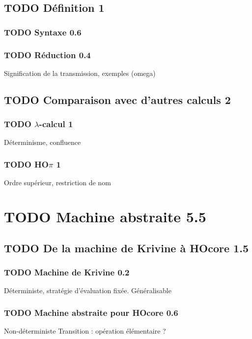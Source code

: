 \documentclass[11pt]{article}
\begin{document}
\subsection{{\bfseries\sffamily TODO} Définition 1}
\label{sec-2-1}
\subsubsection{{\bfseries\sffamily TODO} Syntaxe 0.6}
\label{sec-2-1-1}
\subsubsection{{\bfseries\sffamily TODO} Réduction 0.4}
\label{sec-2-1-2}
Signification de la transmission, exemples (omega)
\subsection{{\bfseries\sffamily TODO} Comparaison avec d'autres calculs 2}
\label{sec-2-2}
\subsubsection{{\bfseries\sffamily TODO} $\lambda$-calcul 1}
\label{sec-2-2-1}
Déterminisme, confluence
\subsubsection{{\bfseries\sffamily TODO} HO$\pi$ 1}
\label{sec-2-2-2}
Ordre supérieur, restriction de nom


\section{{\bfseries\sffamily TODO} Machine abstraite 5.5}
\label{sec-3}
\subsection{{\bfseries\sffamily TODO} De la machine de Krivine à HOcore 1.5}
\label{sec-3-1}
\subsubsection{{\bfseries\sffamily TODO} Machine de Krivine 0.2}
\label{sec-3-1-1}
Déterministe, stratégie d'évaluation fixée. Généralisable
\subsubsection{{\bfseries\sffamily TODO} Machine abstraite pour HOcore 0.6}
\label{sec-3-1-2}
Non-déterministe
Transition : opération élémentaire ?
\end{document}
